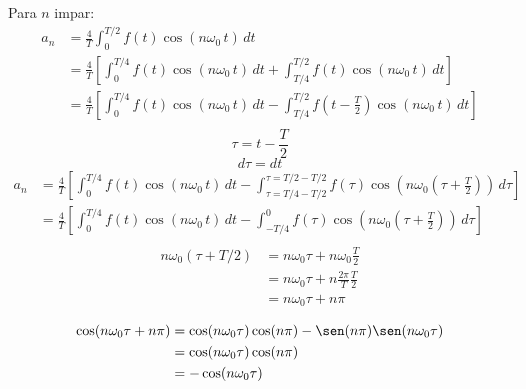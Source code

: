 Para $n$ impar:
\begin{equation*}
\begin{split}
    a_n
        &=\frac{4}{T}\int_0^{T/2}f(t)\cos(n\omega_0\,t)\,dt\\
        &=\frac{4}{T}\left[
            \int_0^{T/4}f(t)\cos(n\omega_0\,t)\,dt+
            \int_{T/4}^{T/2}f(t)\cos(n\omega_0\,t)\,dt
        \right]\\
        &=\frac{4}{T}\left[
            \int_0^{T/4}f(t)\cos(n\omega_0\,t)\,dt-
            \int_{T/4}^{T/2}f(t-\frac{T}{2})\cos(n\omega_0\,t)\,dt
        \right]\\
\end{split}
\end{equation*}
\begin{equation*}
    \tau=t-\frac{T}{2}
\end{equation*}
\begin{equation*}
    d\tau=dt
\end{equation*}
\begin{equation*}
\begin{split}
    a_n
        &=\frac{4}{T}\left[
            \int_0^{T/4}f(t)\cos(n\omega_0\,t)\,dt-
            \int_{\tau=T/4-T/2}^{\tau=T/2-T/2}
                f(\tau)\cos(n\omega_0(\tau+\frac{T}{2}))\,d\tau
        \right]\\
        &=\frac{4}{T}\left[
            \int_0^{T/4}f(t)\cos(n\omega_0\,t)\,dt-
            \int_{-T/4}^{0}f(\tau)\cos(n\omega_0(\tau+\frac{T}{2}))\,d\tau
        \right]\\
\end{split}
\end{equation*}
\begin{equation*}
\begin{split}
    n\omega_0(\tau+T/2)
        &=n\omega_0\tau+n\omega_0\frac{T}{2}\\
        &=n\omega_0\tau+n\frac{2\pi}{T}\frac{T}{2}\\
        &=n\omega_0\tau+n\pi\\
\end{split}
\end{equation*}
\begin{equation*}
\begin{split}
    \cos(n\omega_0\tau+n\pi)
        &=\cos(n\omega_0\tau)\cos(n\pi)-\sen(n\pi)\sen(n\omega_0\tau)\\
        &=\cos(n\omega_0\tau)\cos(n\pi)\\
        &=-\cos(n\omega_0\tau)\\
\end{split}
\end{equation*}
